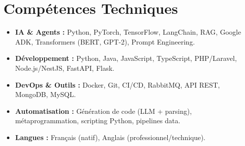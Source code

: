 \documentclass[a4paper,11pt]{article}
\begin{document}
\section{Compétences Techniques}
\begin{itemize}[leftmargin=*, nosep]
    \item \small{\textbf{IA \& Agents :} Python, PyTorch, TensorFlow, LangChain, RAG, Google ADK, Transformers (BERT, GPT-2), Prompt Engineering.}
    \item \small{\textbf{Développement :} Python, Java, JavaScript, TypeScript, PHP/Laravel, Node.js/NestJS, FastAPI, Flask.}
    \item \small{\textbf{DevOps \& Outils :} Docker, Git, CI/CD, RabbitMQ, API REST, MongoDB, MySQL.}
    \item \small{\textbf{Automatisation :} Génération de code (LLM + parsing), métaprogrammation, scripting Python, pipelines data.}
    \item \small{\textbf{Langues :} Français (natif), Anglais (professionnel/technique).}
\end{itemize}

\end{document}
